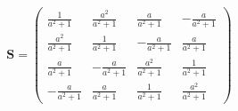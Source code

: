 \[ \mathbf{S} = \left(\begin{array}{cccc}  \frac{ 1 }{a^2 + 1}  &
\frac{ a^2 }{ a^2 + 1 }  &  \frac{ a }{ a^2 + 1 }  &  -\frac{ a }{ a^2
+ 1 }  \\  \frac{ a^2 }{ a^2 + 1 }  &  \frac{ 1 }{a^2 + 1}  &  -\frac{
a }{ a^2 + 1 }  &  \frac{ a }{ a^2 + 1 }  \\  \frac{ a }{ a^2 + 1 }  &
-\frac{ a }{ a^2 + 1 }  &  \frac{ a^2 }{ a^2 + 1 }  &  \frac{ 1 }{a^2
+ 1}  \\  -\frac{ a }{ a^2 + 1 }  &  \frac{ a }{ a^2 + 1 }  &  \frac{
1 }{a^2 + 1}  &  \frac{ a^2 }{ a^2 + 1 }  \end{array}\right) \]
